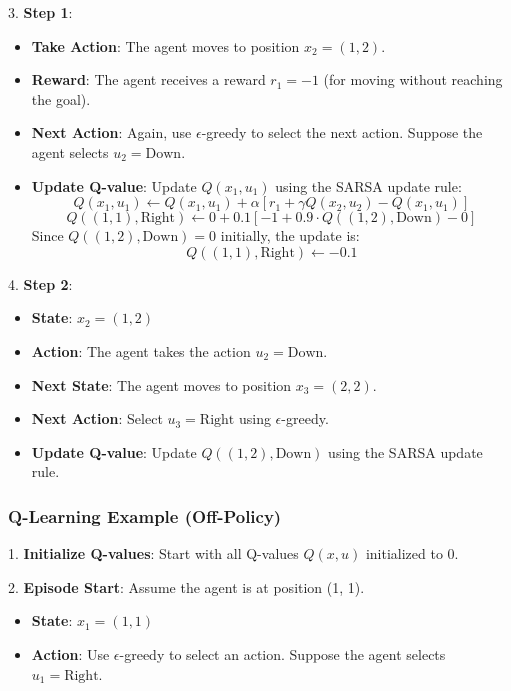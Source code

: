 3. \textbf{Step 1}:
   \begin{itemize}
       \item \textbf{Take Action}: The agent moves to position \( x_2 = (1, 2) \).
       \item \textbf{Reward}: The agent receives a reward \( r_1 = -1 \) (for moving without reaching the goal).
       \item \textbf{Next Action}: Again, use \(\epsilon\)-greedy to select the next action. Suppose the agent selects \( u_2 = \text{Down} \).
       \item \textbf{Update Q-value}: Update \( Q(x_1, u_1) \) using the SARSA update rule:
       \[
       Q(x_1, u_1) \leftarrow Q(x_1, u_1) + \alpha \left[ r_1 + \gamma Q(x_2, u_2) - Q(x_1, u_1) \right]
       \]
       \[
       Q((1, 1), \text{Right}) \leftarrow 0 + 0.1 \left[ -1 + 0.9 \cdot Q((1, 2), \text{Down}) - 0 \right]
       \]
       Since \( Q((1, 2), \text{Down}) = 0 \) initially, the update is:
       \[
       Q((1, 1), \text{Right}) \leftarrow -0.1
       \]
   \end{itemize}

4. \textbf{Step 2}:
   \begin{itemize}
       \item \textbf{State}: \( x_2 = (1, 2) \)
       \item \textbf{Action}: The agent takes the action \( u_2 = \text{Down} \).
       \item \textbf{Next State}: The agent moves to position \( x_3 = (2, 2) \).
       \item \textbf{Next Action}: Select \( u_3 = \text{Right} \) using \(\epsilon\)-greedy.
       \item \textbf{Update Q-value}: Update \( Q((1, 2), \text{Down}) \) using the SARSA update rule.
   \end{itemize}

\subsubsection*{Q-Learning Example (Off-Policy)}

1. \textbf{Initialize Q-values}: Start with all Q-values \( Q(x, u) \) initialized to 0.

2. \textbf{Episode Start}: Assume the agent is at position (1, 1).
   \begin{itemize}
       \item \textbf{State}: \( x_1 = (1, 1) \)
       \item \textbf{Action}: Use \(\epsilon\)-greedy to select an action. Suppose the agent selects \( u_1 = \text{Right} \).
   \end{itemize}

